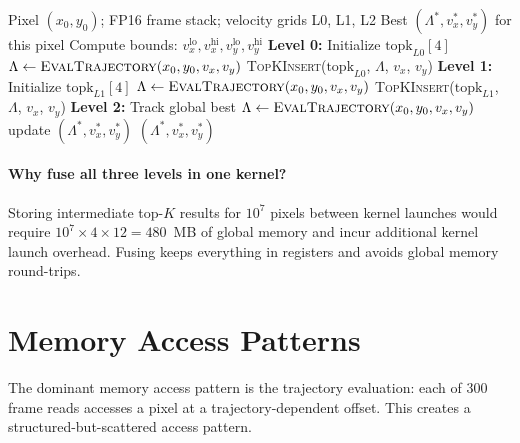 \documentclass[11pt,letterpaper]{article}
\begin{document}
\begin{algorithm}[H]
\caption{Per-thread pyramid search}
\label{alg:pyramid}
\begin{algorithmic}[1]
\Require Pixel $(x_0, y_0)$; FP16 frame stack; velocity grids L0, L1, L2
\Ensure Best $(\Lambda^*, v_x^*, v_y^*)$ for this pixel
\State Compute bounds: $v_x^{\text{lo}}, v_x^{\text{hi}}, v_y^{\text{lo}}, v_y^{\text{hi}}$
\Statex
\State \textbf{Level 0:} Initialize $\text{topk}_{L0}[4]$
    \State $\Lambda \gets \textsc{EvalTrajectory}(x_0, y_0, v_x, v_y)$
    \State \textsc{TopKInsert}($\text{topk}_{L0}$, $\Lambda$, $v_x$, $v_y$)
\EndFor
\Statex
\State \textbf{Level 1:} Initialize $\text{topk}_{L1}[4]$
        \State $\Lambda \gets \textsc{EvalTrajectory}(x_0, y_0, v_x, v_y)$
        \State \textsc{TopKInsert}($\text{topk}_{L1}$, $\Lambda$, $v_x$, $v_y$)
    \EndFor
\EndFor
\Statex
\State \textbf{Level 2:} Track global best
        \State $\Lambda \gets \textsc{EvalTrajectory}(x_0, y_0, v_x, v_y)$
        \If{$\Lambda > \Lambda^*$} update $(\Lambda^*, v_x^*, v_y^*)$ \EndIf
    \EndFor
\EndFor
\State \Return $(\Lambda^*, v_x^*, v_y^*)$
\end{algorithmic}
\end{algorithm}

\paragraph{Why fuse all three levels in one kernel?}
Storing intermediate top-$K$ results for $10^7$ pixels between kernel
launches would require $10^7 \times 4 \times 12 = 480$~MB of global
memory and incur additional kernel launch overhead. Fusing keeps
everything in registers and avoids global memory round-trips.


\section{Memory Access Patterns}
\label{sec:memory}

The dominant memory access pattern is the trajectory evaluation:
each of 300 frame reads accesses a pixel at a trajectory-dependent
offset. This creates a structured-but-scattered access pattern.
\end{document}
